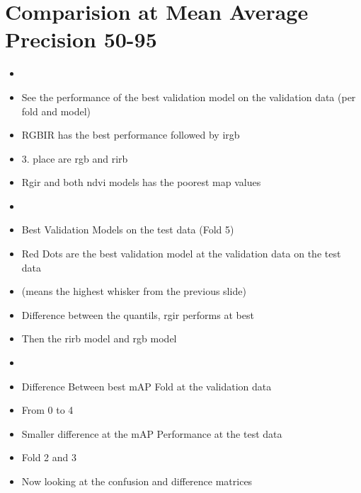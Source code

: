 \section{Comparision at Mean Average Precision 50-95}

\begin{itemize}
    \item {}
    \item See the performance of the best validation model on the validation data (per fold and model)
    \item RGBIR has the best performance followed by irgb 
    \item 3. place are rgb and rirb
    \item Rgir and both ndvi models has the poorest map values
\end{itemize}

\begin{itemize}
    \item {}
    \item Best Validation Models on the test data (Fold 5)
    \item Red Dots are the best validation model at the validation data on the test data
    \item (means the highest whisker from the previous slide)
    \item Difference between the quantils, rgir performs at best
    \item Then the rirb model and rgb model 
\end{itemize}

\begin{itemize}
    \item {}
    \item Difference Between best mAP Fold at the validation data
    \item From 0 to 4
    \item Smaller difference at the mAP Performance at the test data
    \item Fold 2 and 3
    \item Now looking at the confusion and difference matrices
\end{itemize}



